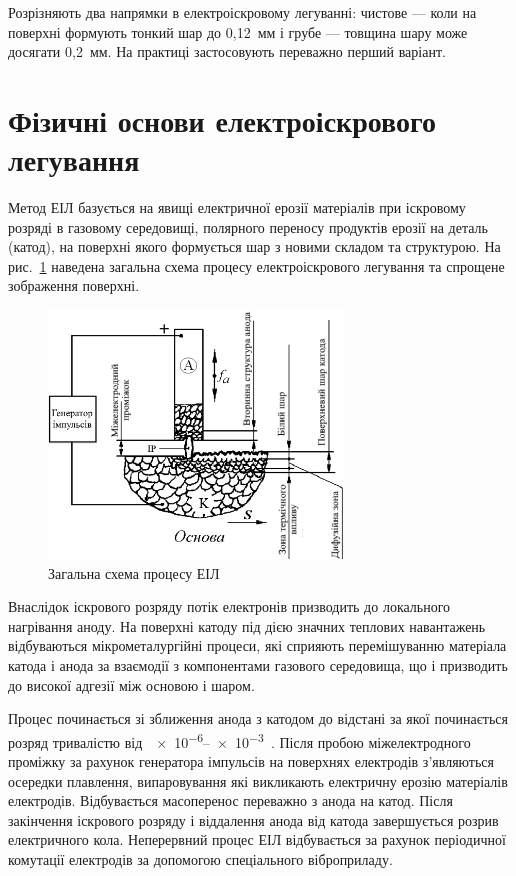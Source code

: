 \documentclass[a4paper,fontsize=14bp,ukrainian]{extreport}
\begin{document}
Розрізняють два напрямки в електроіскровому легуванні: чистове --- коли на поверхні формують тонкий шар до 0,12~мм і грубе --- товщина шару може досягати 0,2~мм. На практиці застосовують переважно перший варіант.

\section{Фізичні основи електроіскрового легування}

Метод ЕІЛ базується на явищі електричної ерозії матеріалів при іскровому розряді в газовому середовищі, полярного переносу продуктів ерозії на деталь (катод), на поверхні якого формується шар з новими складом та структурою. На рис.~\ref{fig:schema_eil} наведена загальна схема процесу електроіскрового легування та спрощене зображення поверхні.

\begin{figure}[H]
\centering
\includegraphics[width=0.7\textwidth]{schema_eil.png}
\caption{Загальна схема процесу ЕІЛ~\cite{ivanov2016}}

\label{fig:schema_eil}
\end{figure}

Внаслідок іскрового розряду потік електронів призводить до локального нагрівання аноду. На поверхні катоду під дією значних теплових навантажень відбуваються мікрометалургійні процеси, які сприяють перемішуванню матеріала катода і анода за взаємодії з компонентами газового середовища, що і призводить до високої адгезії між основою і шаром.~\cite{yarkov2004}

Процес починається зі зближення анода з катодом до відстані за якої починається розряд тривалістю від~\SIrange{e-6}{e-3}{\sec}~\cite{mulin1999}. Після пробою міжелектродного проміжку за рахунок генератора імпульсів на поверхнях електродів з'являються осередки плавлення, випаровування які викликають електричну ерозію матеріалів електродів. Відбувається масоперенос переважно з анода на катод. Після закінчення іскрового розряду і віддалення анода від катода завершується розрив електричного кола. Неперервний процес ЕІЛ відбувається за рахунок періодичної комутації електродів за допомогою спеціального віброприладу.
\end{document}
